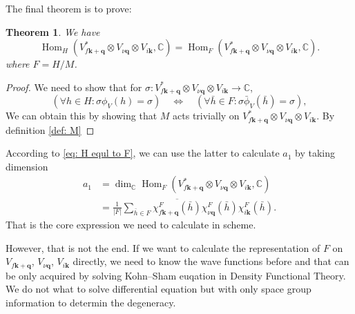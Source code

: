 \documentclass[11pt, reqno]{amsart}
\newtheorem{theorem}{Theorem}[section]
\theoremstyle{definition}
\theoremstyle{remark}
\begin{document}
The final theorem is to prove:
\begin{theorem}
    We have
    \begin{equation}\label{eq: H equl to F}
        \operatorname{Hom}_H\left( V_{f\mathbf{k}+\mathbf{q}}^{*}\otimes V_{\nu \mathbf{q}}\otimes V_{i\mathbf{k}},\mathbb{C} \right) =\operatorname{Hom}_F\left( V_{f\mathbf{k}+\mathbf{q}}^{*}\otimes V_{\nu \mathbf{q}}\otimes V_{i\mathbf{k}},\mathbb{C} \right).
    \end{equation}
    where $F=H/M$.
\end{theorem}
\begin{proof}
    We need to show that for $\sigma: V_{f\mathbf{k}+\mathbf{q}}^{*}\otimes V_{\nu \mathbf{q}}\otimes V_{i\mathbf{k}}\to\mathbb{C}$, %
    \begin{equation}
        \left( \forall h\in H:\sigma \phi _V\left( h \right) =\sigma \right) \quad \Longleftrightarrow \quad \left( \forall \bar{h}\in F:\sigma \bar{\phi}_V\left( \bar{h} \right) =\sigma \right) ,
    \end{equation}
    We can obtain this by showing that $M$ acts trivially on $V_{f\mathbf{k}+\mathbf{q}}^{*}\otimes V_{\nu \mathbf{q}}\otimes V_{i\mathbf{k}}$. By definition \ref{def: M}
\end{proof}

According to \ref{eq: H equl to F}, we can use the latter to calculate $a_1$ by taking dimension
\begin{align}
    a_1&=\dim_{\mathbb{C}}\operatorname{Hom}_F\left( V_{f\mathbf{k}+\mathbf{q}}^{*}\otimes V_{\nu \mathbf{q}}\otimes V_{i\mathbf{k}},\mathbb{C} \right)
    \\
    \label{eq: F characters inner product}
    &=\frac{1}{\left| F \right|}\sum_{\bar{h}\in F}{\overline{\chi _{f\mathbf{k}+\mathbf{q}}^{F}\left( \bar{h} \right) }\chi _{\nu \mathbf{q}}^{F}\left( \bar{h} \right) \chi _{i\mathbf{k}}^{F}\left( \bar{h} \right)}.
\end{align}
That is the core expression we need to calculate in scheme.


However, that is not the end. If we want to calculate the representation of $F$ on $V_{f\mathbf{k}+\mathbf{q}}$, $V_{\nu \mathbf{q}}$, $V_{i\mathbf{k}}$ directly, we need to know the wave functions before and that can be only acquired by solving Kohn--Sham euqation in Density Functional Theory. We do not what to solve differential equation but with only space group information to determin the degeneracy.
\end{document}
